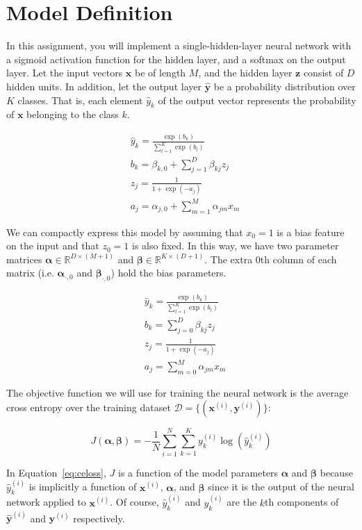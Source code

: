 \documentclass[11pt,addpoints,answers]{exam}
\newcommand{\Dc}{\mathcal{D}}
\newcommand{\Rb}{\mathbb{R}}
\newcommand{\xv}{\mathbf{x}}
\newcommand{\yv}{\mathbf{y}}
\newcommand{\zv}{\mathbf{z}}
\newcommand{\alphav     }{\boldsymbol \alpha     }
\newcommand{\betav      }{\boldsymbol \beta      }
\begin{document}
\section{Model Definition}

In this assignment, you will implement a single-hidden-layer neural network with a sigmoid activation function for the hidden layer, and a softmax on the output layer. Let the input vectors $\xv$ be of length $M$, and the hidden layer $\zv$ consist of $D$ hidden units. In addition, let the output layer $\hat{\yv}$ be a probability distribution over $K$ classes. That is, each element $\hat{y}_k$ of the output vector represents the probability of $\xv$ belonging to the class $k$.

\begin{align*}
&  \hat{y}_k = \frac{\exp(b_k)}{\sum_{l=1}^K \exp(b_l)}
\\
& b_k =  \beta_{k,0} + \sum_{j=1}^D \beta_{kj} z_j
\\
& z_j = \frac{1}{1+\exp(-a_j)}
\\
& a_j = \alpha_{j,0} + \sum_{m=1}^M \alpha_{jm} x_m
\end{align*}

We can compactly express this model by assuming that $x_0=1$ is a bias feature on the input and that $z_0=1$ is also fixed. In this way, we have two parameter matrices $\alphav \in \Rb^{D \times (M+1)}$ and $\betav \in \Rb^{K \times (D+1)}$. The extra $0$th column of each matrix (i.e. $\alphav_{\cdot,0}$ and $\betav_{\cdot,0}$) hold the bias parameters.

\begin{align*}
&  \hat{y}_k = \frac{\exp(b_k)}{\sum_{l=1}^K \exp(b_l)}
\\
& b_k =  \sum_{j=0}^D \beta_{kj} z_j
\\
& z_j = \frac{1}{1+\exp(-a_j)}
\\
& a_j = \sum_{m=0}^M \alpha_{jm} x_m
\end{align*}

The objective function we will use for training the neural network is the average cross entropy over the training dataset $\Dc = \{ (\xv^{(i)}, \yv^{(i)}) \}$:

\begin{equation}
\label{eq:celoss}
J(\alphav, \betav)= - \frac{1}{N} \sum_{i=1}^N \sum_{k=1}^{K} y_k^{(i)} \log (\hat{y}^{(i)}_k)
\end{equation}

In Equation~\ref{eq:celoss}, $J$ is a function of the model parameters $\alphav$ and $\betav$ because $\hat{y}^{(i)}_k$ is implicitly a function of $\xv^{(i)}$, $\alphav$, and $\betav$ since it is the output of the neural network applied to $\xv^{(i)}$. Of course, $\hat{y}^{(i)}_k$ and $y_k^{(i)}$ are the $k$th components of $\hat{\yv}^{(i)}$ and $\yv^{(i)}$ respectively.
\end{document}

